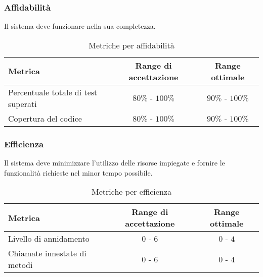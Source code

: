 \documentclass[../PianoDiQualifica.tex]{subfiles}
\begin{document}
			\subsubsection{Affidabilità}
				Il sistema deve funzionare nella sua completezza.\\
				\begin{table}[H]
				\center
					\begin{tabular}{|l|c|c|}
						\hline
						\rowcolor{blue!30}\textbf{Metrica} & \textbf{Range di accettazione} & \textbf{Range ottimale}\\ \hline
						Percentuale totale di test superati & $80\%$ - $100\%$ & $90\%$ - $100\%$ \\ \hline
						Copertura del codice & $80\%$ - $100\%$ & $90\%$ - $100\%$ \\ \hline
					\end{tabular}
					\caption{Metriche per affidabilità}
				\end{table}
			\subsubsection{Efficienza}
				Il sistema deve minimizzare l'utilizzo delle risorse impiegate e
				fornire le funzionalità richieste nel minor tempo possibile.\\
				\begin{table}[H]
				\center
					\begin{tabular}{|l|c|c|}
						\hline
						\rowcolor{blue!30}\textbf{Metrica} & \textbf{Range di accettazione} & \textbf{Range ottimale}\\ \hline
						Livello di annidamento & $0$ - $6$ & $0$ - $4$ \\ \hline
						Chiamate innestate di metodi & $0$ - $6$ & $0$ - $4$ \\ \hline
					\end{tabular}
					\caption{Metriche per efficienza}
				\end{table}
\end{document}
